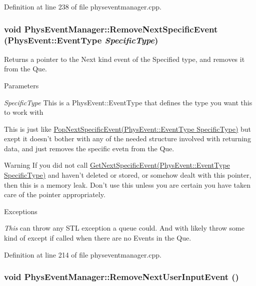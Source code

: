 Definition at line 238 of file physeventmanager.cpp.\hypertarget{classPhysEventManager_a2d0c21e369d16cd2de97eb4c69003323}{
\subsubsection[{RemoveNextSpecificEvent}]{\setlength{\rightskip}{0pt plus 5cm}void PhysEventManager::RemoveNextSpecificEvent (PhysEvent::EventType {\em SpecificType})}}
\label{d5/dd7/classPhysEventManager_a2d0c21e369d16cd2de97eb4c69003323}


Returns a pointer to the Next kind event of the Specified type, and removes it from the Que. 
\begin{DoxyParams}{Parameters}
\item[{\em SpecificType}]This is a PhysEvent::EventType that defines the type you want this to work with\end{DoxyParams}
This is just like \hyperlink{classPhysEventManager_abce156f7ad7ab145b8b05740b48e6073}{PopNextSpecificEvent(PhysEvent::EventType SpecificType)} but exept it doesn't bother with any of the needed structure involved with returning data, and just removes the specific evetn from the Que. \begin{DoxyWarning}{Warning}
If you did not call \hyperlink{classPhysEventManager_a56e45572c2fb84131f7d55c060c7ac21}{GetNextSpecificEvent(PhysEvent::EventType SpecificType)} and haven't deleted or stored, or somehow dealt with this pointer, then this is a memory leak. Don't use this unless you are certain you have taken care of the pointer appropriately. 
\end{DoxyWarning}

\begin{DoxyExceptions}{Exceptions}
\item[{\em This}]can throw any STL exception a queue could. And with likely throw some kind of except if called when there are no Events in the Que. \end{DoxyExceptions}


Definition at line 214 of file physeventmanager.cpp.\hypertarget{classPhysEventManager_a9c6f5296c9961fa469ebe06d7599283a}{
\subsubsection[{RemoveNextUserInputEvent}]{\setlength{\rightskip}{0pt plus 5cm}void PhysEventManager::RemoveNextUserInputEvent ()}}
\label{d5/dd7/classPhysEventManager_a9c6f5296c9961fa469ebe06d7599283a}


